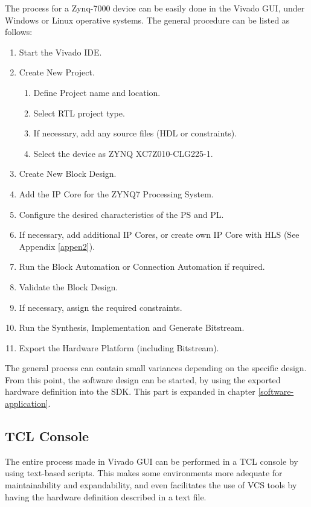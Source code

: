 The process for a Zynq-7000 device can be easily done in the Vivado GUI, under Windows or Linux
operative systems. The general procedure can be listed as follows:

\begin{enumerate}
	\item Start the Vivado IDE.
	\item Create New Project.
	\begin{enumerate}
		\item Define Project name and location.
		\item Select RTL project type.
		\item If necessary, add any source files (HDL or constraints).
		\item Select the device as ZYNQ XC7Z010-CLG225-1.
	\end{enumerate}
	\item Create New Block Design.
	\item Add the IP Core for the ZYNQ7 Processing System.
	\item Configure the desired characteristics of the PS and PL.
	\item If necessary, add additional IP Cores, or create own IP Core with HLS (See Appendix
	\ref{appen2}).
	\item Run the Block Automation or Connection Automation if required.
	\item Validate the Block Design.
	\item If necessary, assign the required constraints.
	\item Run the Synthesis, Implementation and Generate Bitstream.
	\item Export the Hardware Platform (including Bitstream).
\end{enumerate}

The general process can contain small variances depending on the specific design. From this point,
the software design can be started, by using the exported hardware definition into the SDK. This
part is expanded in chapter \ref{software-application}.

\subsection{TCL Console}

The entire process made in Vivado GUI can be performed in a TCL console by using text-based scripts.
This makes some environments more adequate for maintainability and expandability, and even
facilitates the use of VCS tools by having the hardware definition described in a text file.

